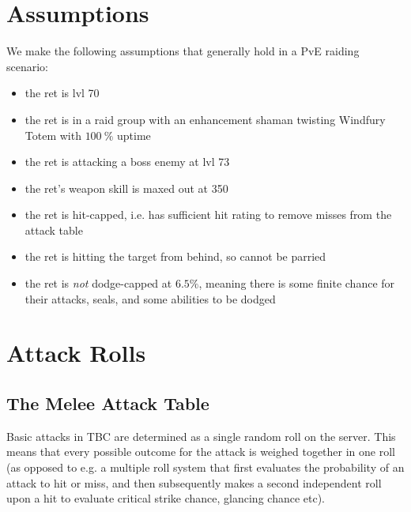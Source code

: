 \documentclass[letterpaper,11pt]{article}
\begin{document}
	\section{Assumptions}
	We make the following assumptions that generally hold in a PvE raiding scenario:
	\begin{itemize}
		\item the ret is lvl 70
		\item the ret is in a raid group with an enhancement shaman twisting Windfury Totem with $100~\%$ uptime
		\item the ret is attacking a boss enemy at lvl 73
		\item the ret's weapon skill is maxed out at 350
		\item the ret is hit-capped, i.e. has sufficient hit rating to remove misses from the attack table
		\item the ret is hitting the target from behind, so cannot be parried
		\item the ret is \emph{not} dodge-capped at $6.5\%$, meaning there is some finite chance for their attacks, seals, and some abilities to be dodged 
	\end{itemize}
	
	\section{Attack Rolls}
	
	\subsection{The Melee Attack Table}
	Basic attacks in TBC are determined as a single random roll on the server.
	This means that every possible outcome for the attack is weighed together in one roll (as opposed to e.g. a multiple roll system that first evaluates the probability of an attack to
	hit or miss, and then subsequently makes a second independent roll upon a hit to evaluate critical strike chance, glancing chance etc).
	
\end{document}
